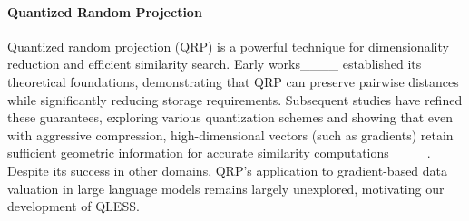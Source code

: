 \paragraph{Quantized Random Projection}  
Quantized random projection (QRP) is a powerful technique for dimensionality reduction and efficient similarity search. Early works____ established its theoretical foundations, demonstrating that QRP can preserve pairwise distances while significantly reducing storage requirements. Subsequent studies have refined these guarantees, exploring various quantization schemes and showing that even with aggressive compression, high-dimensional vectors (such as gradients) retain sufficient geometric information for accurate similarity computations____. Despite its success in other domains, QRP's application to gradient-based data valuation in large language models remains largely unexplored, motivating our development of QLESS.
